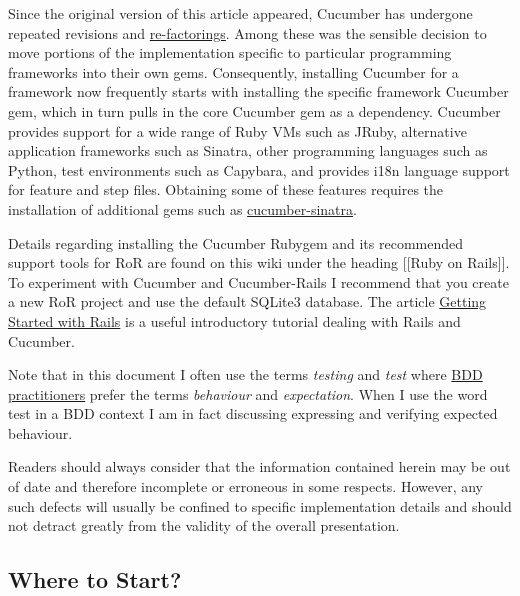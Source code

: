 \documentclass[10pt]{book}
\begin{document}
Since the original version of this article appeared, Cucumber has undergone repeated revisions and \href{http://en.wikipedia.org/wiki/Code_refactoring}{re-factorings}.  Among these was the sensible decision to move portions of the implementation specific to particular programming frameworks into their own gems.  Consequently, installing Cucumber for a framework now frequently starts with installing the specific framework Cucumber gem, which in turn pulls in the core Cucumber gem as a dependency.  Cucumber provides support for a wide range of Ruby VMs such as JRuby, alternative application frameworks such as Sinatra, other programming languages such as Python, test environments such as Capybara, and provides i18n language support for feature and step files.  Obtaining some of these features requires the installation of additional gems such as \href{http://rubygems.org/gems/cucumber-sinatra}{cucumber-sinatra}.

Details regarding installing the Cucumber Rubygem and its recommended support tools for RoR are found on this wiki under the heading  [[Ruby on Rails]].  To experiment with Cucumber and Cucumber-Rails I recommend that you create a new RoR project and use the default SQLite3 database.  The article \href{http://www.ultrasaurus.com/code/2008/12/getting-started-with-rails.html}{Getting Started with Rails} is a useful introductory tutorial dealing with Rails and Cucumber.

Note that in this document I often use the terms \emph{testing} and \emph{test} where \href{http://dannorth.net/introducing-bdd}{BDD practitioners} prefer the terms \emph{behaviour} and \emph{expectation}.  When I use the word test in a BDD context I am in fact discussing expressing and verifying expected behaviour.

Readers should always consider that the information contained herein may be out of date and therefore incomplete or erroneous in some respects.  However, any such defects will usually be confined to specific implementation details and should not detract greatly from the validity of the overall presentation.

\subsection{Where to Start?}
\end{document}
